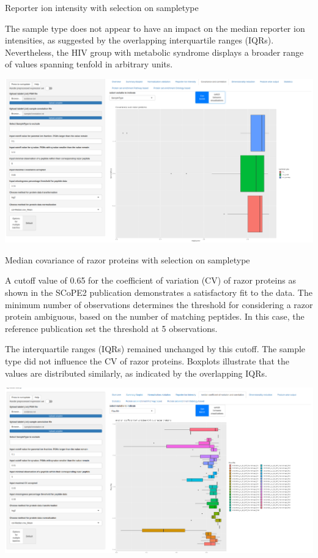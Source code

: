 \documentclass[
  11pt,
]{article}
\let\origfigure\figure
\begin{document}
\caption{Reporter ion intensity with selection on sampletype}\label{fig:ui_RI_st_default}
 \endfigure\egroup

The sample type does not appear to have an impact on the median reporter
ion intensities, as suggested by the overlapping interquartile ranges
(IQRs). Nevertheless, the HIV group with metabolic syndrome displays a
broader range of values spanning tenfold in arbitrary units.

\newpage
\bgroup  \origfigure[H] 

{\centering \includegraphics[width=1\linewidth]{screenshots/cv_st_default} 

}

\caption{Median covariance of razor proteins with selection on sampletype}\label{fig:ui_cv_st_default}
 \endfigure\egroup

A cutoff value of 0.65 for the coefficient of variation (CV) of razor
proteins as shown in the SCoPE2 publication \citep{Specht2021}
demonstrates a satisfactory fit to the data. The minimum number of
observations determines the threshold for considering a razor protein
ambiguous, based on the number of matching peptides. In this case, the
reference publication set the threshold at 5 observations.

The interquartile ranges (IQRs) remained unchanged by this cutoff. The
sample type did not influence the CV of razor proteins. Boxplots
illustrate that the values are distributed similarly, as indicated by
the overlapping IQRs.

\newpage
\bgroup  \origfigure[H] 

{\centering \includegraphics[width=1\linewidth]{screenshots/cv_rawfile_default} 

}
\end{document}
